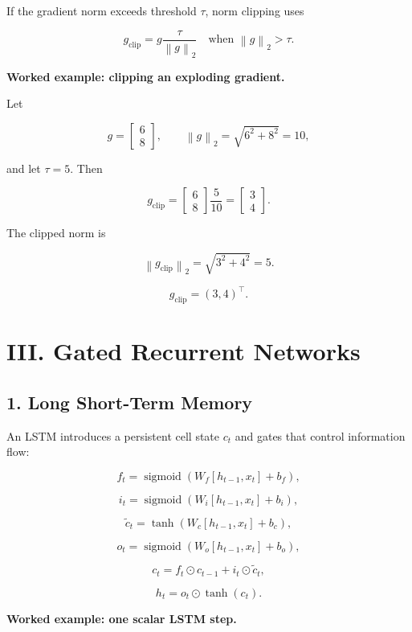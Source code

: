 \documentclass[11pt,a4paper,twoside]{article}
\newcommand{\norm}[1]{\left\lVert#1\right\rVert}
\newcommand{\sigmoid}{\operatorname{sigmoid}}
\begin{document}
If the gradient norm exceeds threshold $\tau$, norm clipping uses

\[
\boxed{
g_{\mathrm{clip}}=g\frac{\tau}{\norm{g}_2}
\quad\text{when }\norm{g}_2>\tau.
}
\]

\textbf{Worked example: clipping an exploding gradient.}

Let

\[
g=\begin{bmatrix}6\\8\end{bmatrix},
\qquad
\norm{g}_2=\sqrt{6^2+8^2}=10,
\]

and let $\tau=5$. Then

\[
g_{\mathrm{clip}}
=\begin{bmatrix}6\\8\end{bmatrix}\frac5{10}
=\begin{bmatrix}3\\4\end{bmatrix}.
\]

The clipped norm is

\[
\norm{g_{\mathrm{clip}}}_2=\sqrt{3^2+4^2}=5.
\]

\[
\boxed{g_{\mathrm{clip}}=(3,4)^\top.}
\]

\section*{III. Gated Recurrent Networks}

\subsection*{1. Long Short-Term Memory}

An LSTM introduces a persistent cell state $c_t$ and gates that control information flow:

\[
f_t=\sigmoid(W_f[h_{t-1},x_t]+b_f),
\]

\[
i_t=\sigmoid(W_i[h_{t-1},x_t]+b_i),
\]

\[
\tilde c_t=\tanh(W_c[h_{t-1},x_t]+b_c),
\]

\[
o_t=\sigmoid(W_o[h_{t-1},x_t]+b_o),
\]

\[
\boxed{c_t=f_t\odot c_{t-1}+i_t\odot\tilde c_t},
\]

\[
\boxed{h_t=o_t\odot\tanh(c_t)}.
\]

\textbf{Worked example: one scalar LSTM step.}
\end{document}
